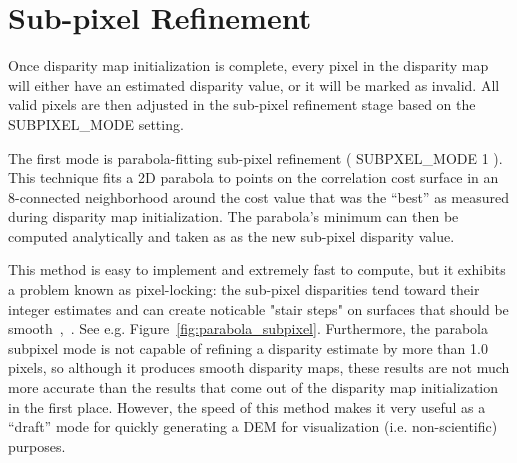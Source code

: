 \section{Sub-pixel Refinement}
\label{sec:subpixel}

Once disparity map initialization is complete, every pixel in the
disparity map will either have an estimated disparity value, or it
will be marked as invalid.  All valid pixels are then adjusted in the
sub-pixel refinement stage based on the SUBPIXEL\_MODE setting.

The first mode is parabola-fitting sub-pixel refinement (
SUBPXEL\_MODE 1 ).  This technique fits a 2D parabola to points on the
correlation cost surface in an 8-connected neighborhood around the
cost value that was the ``best'' as measured during disparity map
initialization. The parabola's minimum can then be computed
analytically and taken as as the new sub-pixel disparity value.

This method is easy to implement and extremely fast to compute, but it
exhibits a problem known as pixel-locking: the sub-pixel disparities
tend toward their integer estimates and can create noticable "stair
steps" on surfaces that should be
smooth~\cite{Stein06:attenuating},~\cite{Szeliski03sampling}.  See
e.g. Figure~\ref{fig:parabola_subpixel}. Furthermore, the parabola
subpixel mode is not capable of refining a disparity estimate by more
than 1.0 pixels, so although it produces smooth disparity maps, these
results are not much more accurate than the results that come out of
the disparity map initialization in the first place.  However, the
speed of this method makes it very useful as a ``draft'' mode for
quickly generating a DEM for visualization (i.e. non-scientific)
purposes.


